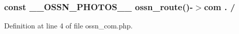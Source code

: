 \subsubsection[{\texorpdfstring{\+\_\+\+\_\+\+O\+S\+S\+N\+\_\+\+P\+H\+O\+T\+O\+S\+\_\+\+\_\+}{__OSSN_PHOTOS__}}]{\setlength{\rightskip}{0pt plus 5cm}const \+\_\+\+\_\+\+O\+S\+S\+N\+\_\+\+P\+H\+O\+T\+O\+S\+\_\+\+\_\+ {\bf ossn\+\_\+route}()-\/$>$com . /\textquotesingle{}}\hypertarget{_ossn_photos_2ossn__com_8php_a622b2f4cdd3cb2eaa43f36170f914ebd}{}\label{_ossn_photos_2ossn__com_8php_a622b2f4cdd3cb2eaa43f36170f914ebd}


Definition at line 4 of file ossn\+\_\+com.\+php.

